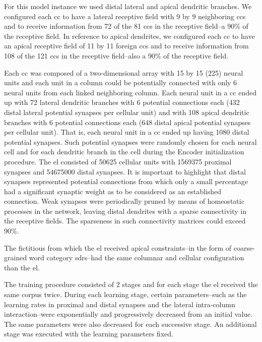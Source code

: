 {For this model instance we used distal lateral and apical dendritic branches. We configured each \gls{cc} to have a lateral receptive field with 9 by 9 neighboring \glspl{cc}
and to receive information from 72 of the 81 \glspl{cc} in the receptive field--a 90\% of the receptive field. In reference to apical dendrites, we configured each \gls{cc} to have an apical receptive field of 11 by 11 foreign \glspl{cc} and to receive information from 108 of the 121 \glspl{cc} in the receptive field--also a 90\% of the receptive field.

Each \gls{cc} was composed of a two-dimensional array with 15 by 15 (225) neural units and each unit in a column could be potentially connected with only 6 neural units from each linked neighboring column. Each neural unit in a \gls{cc} ended up with 72 lateral dendritic branches with 6 potential connections each (432 distal lateral potential synapses per cellular unit) and with 108 apical dendritic branches with 6 potential connections each (648 distal apical potential synapses per cellular unit). That is, each neural unit in a \gls{cc} ended up having 1080 distal potential synapses. Such potential synapses were randomly chosen for each neural cell and for each dendritic branch in the cell during the Encoder initialization procedure. The \gls{el} consisted of 50625 cellular units with 1569375 proximal synapses and 54675000 distal synapses. It is important to highlight that distal synapses represented potential connections from which only a small percentage had a significant synaptic weight as to be considered as an established connection. Weak synapses were periodically pruned by means of homeostatic processes in the network, leaving distal dendrites with a sparse connectivity in the receptive fields. The sparseness in such connectivity matrices could exceed 90\%.

The fictitious  from which the \gls{el} received apical constraints--in the form of coarse-grained word category \glspl{sdr}--had the same columnar and cellular configuration than the \gls{el}.

The training procedure consisted of 2 stages and for each stage the \gls{el} received the same corpus twice. During each learning stage, certain parameters--such as the learning rates in proximal and distal synapses and the lateral intra-column interaction--were exponentially and progressively decreased from an initial value. The same parameters were also decreased for each successive stage. An additional stage was executed with the learning parameters fixed.

}
